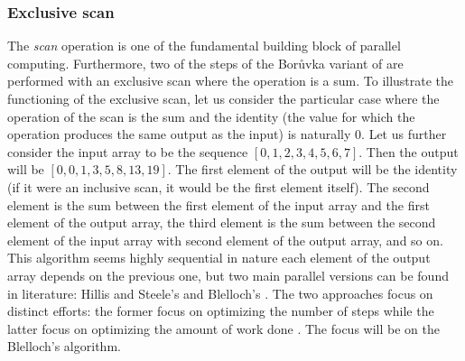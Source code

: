 \subsubsection{Exclusive scan}
\label{sub:scan}


The \emph{scan} operation is one of the fundamental building block of parallel computing. 
Furthermore, two of the steps of the Borůvka variant of \cite{Sousa2015} are performed with an exclusive scan where the operation is a sum. 
To illustrate the functioning of the exclusive scan, let us consider the particular case where the operation of the scan is the sum and the identity (the value for which the operation produces the same output as the input) is naturally $0$.
Let us further consider the input array to be the sequence $[0,1,2,3,4,5,6,7]$.
Then the output will be $[0,0,1,3,5,8,13,19]$.
The first element of the output will be the identity (if it were an inclusive scan, it would be the first element itself).
The second element is the sum between the first element of the input array and the first element of the output array, the third element is the sum between the second element of the input array with second element of the output array, and so on.
This algorithm seems highly sequential in nature each element of the output array depends on the previous one, but two main parallel versions can be found in literature: Hillis and Steele's \cite{Hillis1986} and Blelloch's \cite{Blelloch1990}. 
The two approaches focus on distinct efforts: the former focus on optimizing the number of steps \cite{Hillis1986} while the latter focus on optimizing the amount of work done \cite{Blelloch1990}.
The focus will be on the Blelloch's algorithm.

